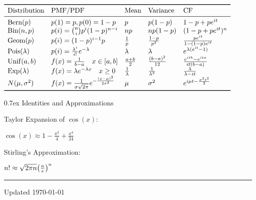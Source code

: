 \documentclass[10pt]{article}
\makeatletter
\newcommand{\tab}{\hspace{.02\textwidth}}
\newcommand{\lrb}[1]{\left(#1\right)}               %
\let\originalleft\left
\let\originalright\right
\renewcommand{\left}{\mathopen{}\mathclose\bgroup\originalleft}
\renewcommand{\right}{\aftergroup\egroup\originalright}
\renewcommand{\section}{\@startsection{section}{1}{0ex}
                                {-1ex}      %
                                {0.7ex}     %
                                {\normalfont\large\bfseries}}
\newcommand{\Bern}{\mathrm{Bern}}
\newcommand{\Bin}{\mathrm{Bin}}
\newcommand{\Geom}{\mathrm{Geom}}
\newcommand{\Pois}{\mathrm{Pois}}
\newcommand{\Unif}{\mathrm{Unif}}
\newcommand{\Exp}{\mathrm{Exp}}
\makeatother
\begin{document}
\begin{multicols*}{3}
$\begin{array}{lllll} \toprule
    \text{Distribution} & \text{PMF/PDF} & \text{Mean} & \text{Variance} & \text{CF} \\ \midrule
    \Bern(p) & p(1)=p, p(0)=1-p & p & p(1-p) & 1-p+pe^{it} \\
    \Bin(n,p) & p(i)=\binom{n}{i}p^i(1-p)^{n-i} & np & np(1-p) & (1-p+pe^{it})^n \\
    \Geom(p) & p(i)=(1-p)^{i-1}p & \frac 1p & \frac{1-p}{p^2} & \frac{pe^{it}}{1-(1-p)e^{it}} \\
    \Pois(\lambda) & p(i)=\frac{\lambda^i}{i!}e^{-\lambda} & \lambda & \lambda & e^{\lambda(e^{it}-1)} \\
    \Unif(a,b) & f(x)=\frac{1}{b-a}\quad x\in[a,b] & \frac{a+b}{2} & \frac{(b-a)^2}{12} & \frac{e^{itb}-e^{ita}}{it(b-a)} \\
    \Exp(\lambda) & f(x)=\lambda e^{-\lambda x}\quad x\ge 0 & \frac{1}{\lambda} & \frac{1}{\lambda^2} & \frac{\lambda}{\lambda-it} \\
    N(\mu,\sigma^2) & f(x)=\frac{1}{\sigma\sqrt{2\pi}}e^{-\frac{(x-\mu)^2}{2\sigma^2}} & \mu & \sigma^2 & e^{i\mu t-\frac{\sigma^2t^2}{2}} \\ \bottomrule
\end{array}$

\section{Identities and Approximations}

Taylor Expansion of $\cos(x)$:

\tab $\cos(x)\approx 1-\frac{x^2}{4}+\frac{x^4}{24}$

Stirling's Approximation:

\tab $n!\approx\sqrt{2\pi n}\lrb{\frac{n}{e}}^n$

\rule{\linewidth}{0.01em}

\scriptsize 
Updated \today

\end{multicols*}
\end{document}
